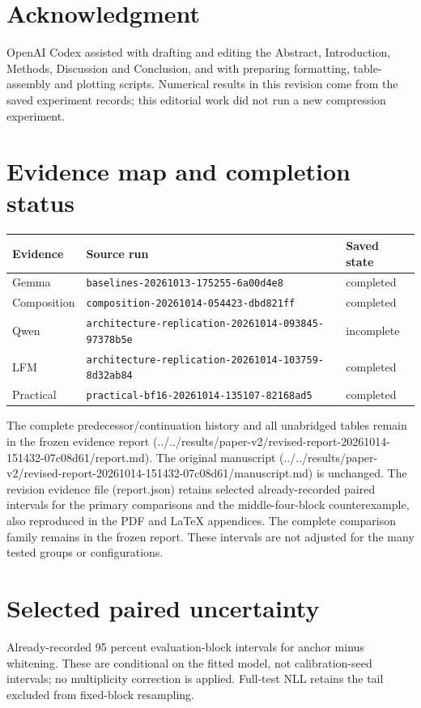 \documentclass[conference]{IEEEtran}
\begin{document}
\section*{Acknowledgment}
OpenAI Codex \cite{openaicodex2026} assisted with drafting and editing the Abstract, Introduction, Methods, Discussion and Conclusion, and with preparing formatting, table-assembly and plotting scripts. Numerical results in this revision come from the saved experiment records; this editorial work did not run a new compression experiment.\par\smallskip
\appendix
\section{Evidence map and completion status}
{\scriptsize\setlength{\tabcolsep}{2pt}
\noindent\begin{tabular}{@{}p{}p{}p{}@{}}\toprule
Evidence & Source run & Saved state \\
\midrule
Gemma & \texttt{baselines-20261013-175255-6a00d4e8} & completed \\
Composition & \texttt{composition-20261014-054423-dbd821ff} & completed \\
Qwen & \texttt{architecture-replication-20261014-093845-97378b5e} & incomplete \\
LFM & \texttt{architecture-replication-20261014-103759-8d32ab84} & completed \\
Practical & \texttt{practical-bf16-20261014-135107-82168ad5} & completed \\
\bottomrule\end{tabular}}\par\medskip
The complete predecessor/continuation history and all unabridged tables remain in the frozen evidence report (../../results/paper-v2/revised-report-20261014-151432-07c08d61/report.md). The original manuscript (../../results/paper-v2/revised-report-20261014-151432-07c08d61/manuscript.md) is unchanged. The revision evidence file (report.json) retains selected already-recorded paired intervals for the primary comparisons and the middle-four-block counterexample, also reproduced in the PDF and LaTeX appendices. The complete comparison family remains in the frozen report. These intervals are not adjusted for the many tested groups or configurations.\par\smallskip
\section{Selected paired uncertainty}
Already-recorded 95 percent evaluation-block intervals for anchor minus whitening. These are conditional on the fitted model, not calibration-seed intervals; no multiplicity correction is applied. Full-test NLL retains the tail excluded from fixed-block resampling.
\end{document}

